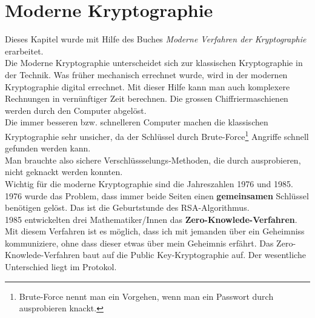 \section{Moderne Kryptographie}
Dieses Kapitel wurde mit Hilfe des Buches \textit{Moderne Verfahren der Kryptographie} erarbeitet.\\[2ex]
Die Moderne Kryptographie unterscheidet sich zur klassischen Kryptographie in der Technik. Was früher mechanisch errechnet wurde, wird in der modernen Kryptographie digital errechnet. Mit dieser Hilfe kann man auch komplexere Rechnungen in vernünftiger Zeit berechnen. Die grossen Chiffriermaschienen werden durch den Computer abgelöst.\\
Die immer besseren bzw. schnelleren Computer machen die klassischen Kryptographie sehr unsicher, da der Schlüssel durch Brute-Force\footnote{Brute-Force nennt man ein Vorgehen, wenn man ein Passwort durch ausprobieren knackt.} Angriffe schnell gefunden werden kann.\\
Man brauchte also sichere Verschlüssselungs-Methoden, die durch ausprobieren, nicht geknackt werden konnten.\\
Wichtig für die moderne Kryptographie sind die Jahreszahlen 1976 und 1985.\\
1976 wurde das Problem, dass immer beide Seiten einen \textbf{gemeinsamen} Schlüssel benötigen gelöst. Das ist die Geburtstunde des RSA-Algorithmus.\\
1985 entwickelten drei Mathematiker/Innen das \textbf{Zero-Knowlede-Verfahren}. Mit diesem Verfahren ist es möglich, dass ich mit jemanden über ein Geheimniss kommuniziere, ohne dass dieser etwas über mein Geheimnis erfährt. Das Zero-Knowlede-Verfahren baut auf die Public Key-Kryptographie auf. Der wesentliche Unterschied liegt im Protokol.
%

